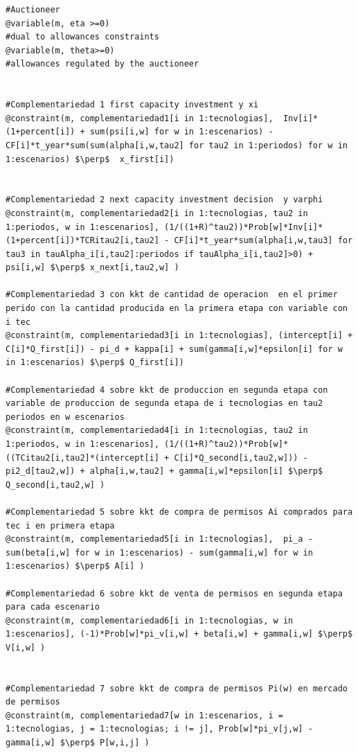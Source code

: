 \begin{footnotesize}
\begin{lstlisting}
#Auctioneer 
@variable(m, eta >=0)                                                           #dual to allowances constraints
@variable(m, theta>=0)                                                          #allowances regulated by the auctioneer


#Complementariedad 1 first capacity investment y xi
@constraint(m, complementariedad1[i in 1:tecnologias],  Inv[i]*(1+percent[i]) + sum(psi[i,w] for w in 1:escenarios) - CF[i]*t_year*sum(sum(alpha[i,w,tau2] for tau2 in 1:periodos) for w in 1:escenarios) $\perp$  x_first[i])


#Complementariedad 2 next capacity investment decision  y varphi
@constraint(m, complementariedad2[i in 1:tecnologias, tau2 in 1:periodos, w in 1:escenarios], (1/((1+R)^tau2))*Prob[w]*Inv[i]*(1+percent[i])*TCRitau2[i,tau2] - CF[i]*t_year*sum(alpha[i,w,tau3] for tau3 in tauAlpha_i[i,tau2]:periodos if tauAlpha_i[i,tau2]>0) + psi[i,w] $\perp$ x_next[i,tau2,w] )

#Complementariedad 3 con kkt de cantidad de operacion  en el primer perido con la cantidad producida en la primera etapa con variable con i tec  
@constraint(m, complementariedad3[i in 1:tecnologias], (intercept[i] + C[i]*Q_first[i]) - pi_d + kappa[i] + sum(gamma[i,w]*epsilon[i] for w in 1:escenarios) $\perp$ Q_first[i])

#Complementariedad 4 sobre kkt de produccion en segunda etapa con variable de produccion de segunda etapa de i tecnologias en tau2 periodos en w escenarios
@constraint(m, complementariedad4[i in 1:tecnologias, tau2 in 1:periodos, w in 1:escenarios], (1/((1+R)^tau2))*Prob[w]*((TCitau2[i,tau2]*(intercept[i] + C[i]*Q_second[i,tau2,w])) - pi2_d[tau2,w]) + alpha[i,w,tau2] + gamma[i,w]*epsilon[i] $\perp$ Q_second[i,tau2,w] )

#Complementariedad 5 sobre kkt de compra de permisos Ai comprados para tec i en primera etapa
@constraint(m, complementariedad5[i in 1:tecnologias],  pi_a - sum(beta[i,w] for w in 1:escenarios) - sum(gamma[i,w] for w in 1:escenarios) $\perp$ A[i] )

#Complementariedad 6 sobre kkt de venta de permisos en segunda etapa para cada escenario
@constraint(m, complementariedad6[i in 1:tecnologias, w in 1:escenarios], (-1)*Prob[w]*pi_v[i,w] + beta[i,w] + gamma[i,w] $\perp$ V[i,w] )


#Complementariedad 7 sobre kkt de compra de permisos Pi(w) en mercado de permisos  
@constraint(m, complementariedad7[w in 1:escenarios, i = 1:tecnologias, j = 1:tecnologias; i != j], Prob[w]*pi_v[j,w] - gamma[i,w] $\perp$ P[w,i,j] )


\end{lstlisting}
\end{footnotesize}
